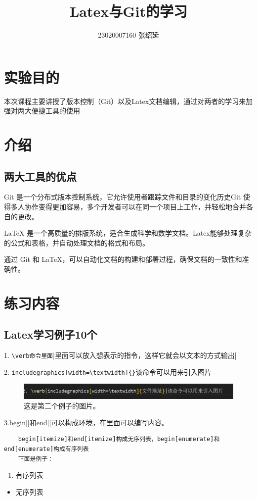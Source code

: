 \documentclass{article}
\title{Latex与Git的学习}
\author{23020007160  张绍延}
\begin{document}
\maketitle

\section{实验目的}
本次课程主要讲授了版本控制（Git）以及Latex文档编辑，通过对两者的学习来加强对两大便捷工具的使用

\section{介绍}
\subsection{两大工具的优点}
Git 是一个分布式版本控制系统，它允许使用者跟踪文件和目录的变化历史Git 使得多人协作变得更加容易，多个开发者可以在同一个项目上工作，并轻松地合并各自的更改。

LaTeX 是一个高质量的排版系统，适合生成科学和数学文档。Latex能够处理复杂的公式和表格，并自动处理文档的格式和布局。

通过 Git 和 LaTeX，可以自动化文档的构建和部署过程，确保文档的一致性和准确性。
\section{练习内容}
\subsection{Latex学习例子10个}
1. \verb|\verb命令里面||里面可以放入想表示的指令，这样它就会以文本的方式输出|

2. \verb|includegraphics[width=\textwidth]{}|该命令可以用来引入图片
\begin{figure}
    \centering %
    \includegraphics[width=\textwidth]{"图片.png"}
    \caption{这是第二个例子的图片。} %
    \label{fig:example} %
\end{figure}

3.begin[]和end[]可以构成环境，在里面可以编写内容。
\begin{verbatim}
    begin[itemize]和end[itemize]构成无序列表，begin[enumerate]和end[enumerate]构成有序列表
    下面是例子：
    \end{verbatim}
    \begin{enumerate}
        \item 有序列表
     \end{enumerate}%
     \begin{itemize}
        \item 无序列表
    \end{itemize}%
   
\end{document}
